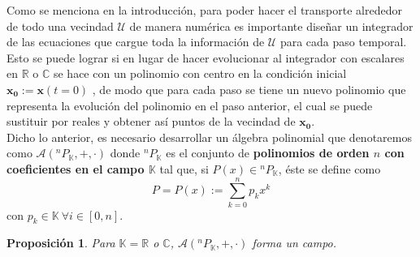 \documentclass[letterpaper,12pt]{book}
\newtheorem{proposicion}[theorem]{Proposición}
\begin{document}
\newcommand{\polk}[1]{\sum_{k=0}^n #1 x^k}
\newcommand{\polj}[1]{(\sum_{j=0}^k #1 )}
\newcommand{\pk}{{^{n}P_{\mathbb{K}}}}

Como se menciona en la introducción, para poder hacer el transporte alrededor de todo una vecindad $\mathcal{U}$ de manera numérica es importante diseñar un integrador de las ecuaciones que cargue toda la información de $\mathcal{U}$ para cada paso temporal. Esto se puede lograr si en lugar de hacer evolucionar al integrador con escalares en $\mathbb{R}$ o $\mathbb{C}$ se hace con un polinomio con centro en la condición inicial $\mathbf{x_0} := \mathbf{x}(t=0)$ , de modo que para cada paso se tiene un nuevo polinomio que representa la evolución del polinomio en el paso anterior, el cual se puede sustituir por reales y obtener así puntos de la vecindad de $\mathbf{x_0}$. \\

Dicho lo anterior, es necesario desarrollar un álgebra polinomial que denotaremos como $\mathcal{A}(^{n}P_{\mathbb{K}},+,\cdot)$ donde $^{n}P_{\mathbb{K}}$ es el conjunto de \textbf{polinomios de orden $n$ con coeficientes en el campo $\mathbb{K}$} tal que, si  $P(x) \in \pk$, éste se define como
$$P = P(x) := \polk{p_k} $$
con $p_k \in \mathbb{K} \  \forall i \in [0,n]$.


\begin{proposicion}
Para $\mathbb{K} = \mathbb{R}$ o $\mathbb{C}$, $\mathcal{A}(^{n}P_{\mathbb{K}},+,\cdot)$ forma un campo.
\end{proposicion}
\end{document}
